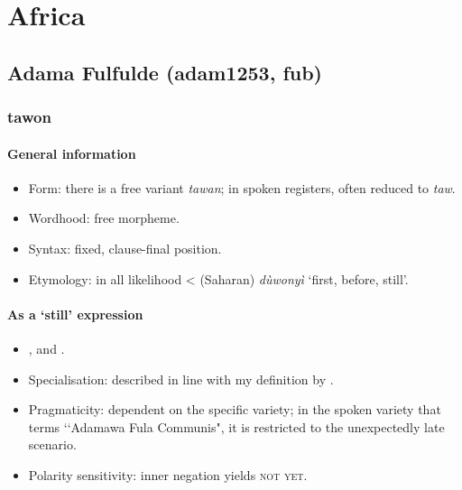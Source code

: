 \chapter{Africa}

\section{Adama Fulfulde (adam1253, fub)} 
\label{appendixAdamawa}
\subsection{tawon}

\subsubsection{General information}
\begin{itemize}
	\item Form: there is a free variant \textit{tawan}; in spoken registers, often reduced to \textit{taw}.
	\item Wordhood: free morpheme.
	\item Syntax: fixed, clause-final position.
	\item Etymology: in all likelihood <  (Saharan) \textit{dùwonyì} \lq first, before, still'.
\end{itemize}


\subsubsection{As a  \lq still\rq{ }expression}
\begin{itemize}
	\item  \textcite[54, 387, 435]{Kingenheben1963}, \textcite{Kramer2021Adamawa} and \textcite[s.v. \textit{yet}]{deWolf1995}.
	\item Specialisation: described in line with my definition by \textcite{Kramer2021Adamawa}.
	\item Pragmaticity: dependent on the specific variety; in the spoken variety that \citeauthor{Kramer2021Adamawa} terms \lq\lq Adamawa Fula Communis", it is restricted to the unexpectedly late scenario.
	\item Polarity sensitivity: inner negation yields \textsc{not yet}.
\end{itemize}

